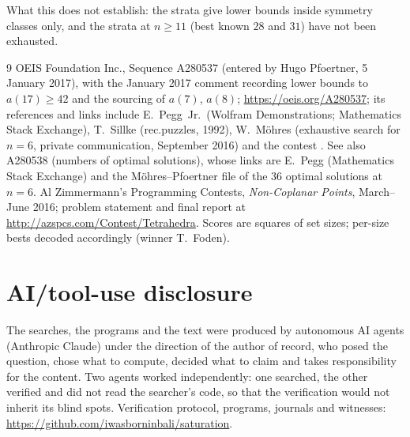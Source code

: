 \documentclass[11pt,a4paper]{article}
\begin{document}
What this does not establish: the strata give lower bounds inside symmetry classes only, and the
strata at $n\ge11$ (best known $28$ and $31$) have not been exhausted.

\begin{thebibliography}{9}
 OEIS Foundation Inc., Sequence A280537 (entered by Hugo Pfoertner, 5 January 2017), with the
January 2017 comment recording lower bounds to $a(17)\ge42$ and the sourcing of $a(7)$, $a(8)$;
\url{https://oeis.org/A280537}; its references and links include E.~Pegg~Jr.\ (Wolfram Demonstrations;
Mathematics Stack Exchange), T.~Sillke (rec.puzzles, 1992), W.~M\"ohres (exhaustive search for $n=6$, private
communication, September 2016) and the contest \cite{AZsPCs}.  See also A280538 (numbers of optimal solutions),
whose links are E.~Pegg (Mathematics Stack Exchange) and the M\"ohres--Pfoertner file of the $36$ optimal
solutions at $n=6$.
 Al Zimmermann's Programming Contests, \emph{Non-Coplanar Points}, March--June
2016; problem statement and final report at \url{http://azspcs.com/Contest/Tetrahedra}.  Scores
are squares of set sizes; per-size bests decoded accordingly (winner T.~Foden).
\end{thebibliography}

\section*{AI/tool-use disclosure}
The searches, the programs and the text were produced by autonomous AI agents (Anthropic Claude)
under the direction of the author of record, who posed the question, chose what to compute,
decided what to claim and takes responsibility for the content.  Two agents worked independently:
one searched, the other verified and did not read the searcher's code, so that the verification
would not inherit its blind spots.  Verification protocol, programs, journals and witnesses:
\url{https://github.com/iwasborninbali/saturation}.
\end{document}
